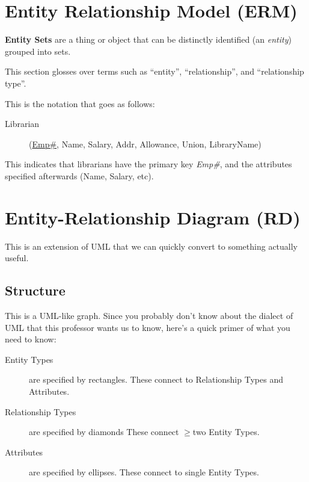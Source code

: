             \section{Entity Relationship Model (ERM)} %
            \label{sec:entity_relationship_model}
                \textbf{Entity Sets} are a thing or object that can be distinctly identified (an \textit{entity}) grouped into sets.

                This section glosses over terms such as ``entity'', ``relationship'', and ``relationship type''.

                This is the notation that goes as follows:
                \begin{description}
                    \item[Librarian] (\uline{Emp\#}, Name, Salary, Addr, Allowance, Union, LibraryName)
                \end{description}
                This indicates that librarians have the primary key \textit{Emp\#}, and the attributes specified afterwards (Name, Salary, etc).
            \section{Entity-Relationship Diagram (RD)} %
            \label{sec:entity_relationship_diagram_}
                This is an extension of UML that we can quickly convert to something actually useful.

                \subsection{Structure} %
                \label{sub:structure}
                    This is a UML-like graph.
                    Since you probably don't know about the dialect of UML that this professor wants us to know, here's a quick primer of what you need to know:
                    \begin{description}
                        \item[Entity Types] are specified by rectangles.
                        These connect to Relationship Types and Attributes.
                        \item[Relationship Types] are specified by diamonds
                        These connect $\ge$two Entity Types.
                        \item[Attributes] are specified by ellipses.
                        These connect to single Entity Types.
                    \end{description}
